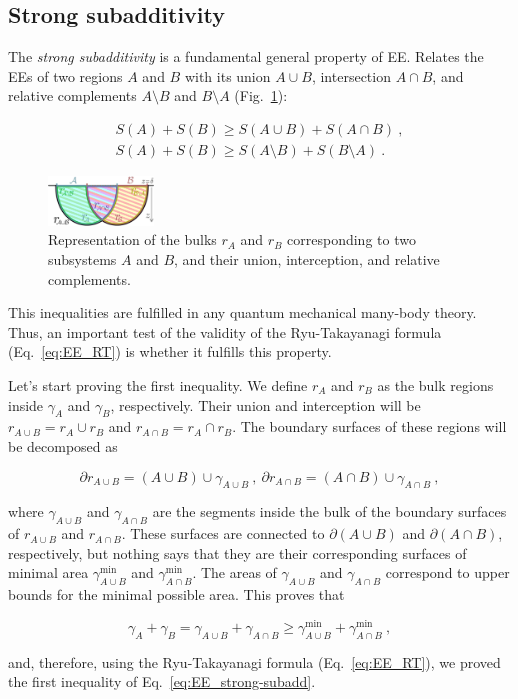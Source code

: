 \documentclass[twocolumn]{revtex4}
\providecommand{\eq}[2]{
    \begin{equation}
        #2
    \label{eq:#1}
    \end{equation}
}
\providecommand{\eqgat}[2]{
    \begin{gather}
        #2
    \label{eq:#1}
    \end{gather}
}
\begin{document}
\subsection{Strong subadditivity} \label{ss:SS}

The \textit{strong subadditivity} \cite{headrick_holographic_2007} is a fundamental general property of EE. Relates the EEs of two regions $A$ and $B$ with its union $A \cup B$, intersection $A \cap B$, and relative complements $A \setminus B$ and $B \setminus A$ (Fig.~\ref{fig:SS}):
\eqgat{EE_strong-subadd}{
    S(A) + S(B) \ge S(A \cup B) + S(A \cap B) \ , \nonumber \\
    S(A) + S(B) \ge S(A \setminus B) + S(B \setminus A) \ .
}

\begin{figure}
    \centering
    \includegraphics[width=0.25\textwidth]{../imatges/SS_D.png}
\caption{Representation of the bulks $r_A$ and $r_B$ corresponding to two subsystems $A$ and $B$, and their union, interception, and relative complements.}
\label{fig:SS}
\end{figure}

This inequalities are fulfilled in any quantum mechanical many-body theory. Thus, an important test of the validity of the Ryu-Takayanagi formula (Eq.~\ref{eq:EE_RT}) is whether it fulfills this property.

Let's start proving the first inequality. We define $r_A$ and $r_B$ as the bulk regions inside $\gamma_A$ and $\gamma_B$, respectively. Their union and interception will be $r_{A \cup B} = r_A \cup r_B$ and $r_{A \cap B} = r_A \cap r_B$. The boundary surfaces of these regions will be decomposed as
\eq{SS_dr-1}{
    \partial r_{A \cup B} = (A \cup B) \cup \gamma_{A \cup B} \ , \ \partial r_{A \cap B } = (A \cap B) \cup \gamma_{A \cap B} \ , \nonumber
}
where $\gamma_{A \cup B}$ and $\gamma_{A \cap B}$ are the segments inside the bulk of the boundary surfaces of $r_{A \cup B}$ and $r_{A \cap B}$. These surfaces are connected to $\partial (A \cup B)$ and $\partial (A \cap B)$, respectively, but nothing says that they are their corresponding surfaces of minimal area $\gamma^{\text{min}}_{A \cup B}$ and $\gamma^{\text{min}}_{A \cap B}$. The areas of $\gamma_{A \cup B}$ and $\gamma_{A \cap B}$ correspond to upper bounds for the minimal possible area. This proves that
\eq{SS_gamma-1}{
    \gamma_A + \gamma_B = \gamma_{A \cup B} + \gamma_{A \cap B} \ge \gamma^{\text{min}}_{A \cup B} + \gamma^{\text{min}}_{A \cap B} \ , \nonumber
}
and, therefore, using the Ryu-Takayanagi formula (Eq.~\ref{eq:EE_RT}), we proved the first inequality of Eq.~\ref{eq:EE_strong-subadd}.
\end{document}
